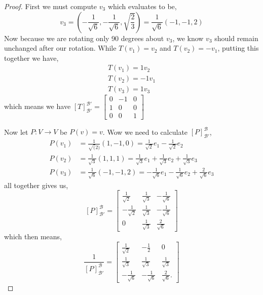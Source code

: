 \documentclass[11pt]{article}
\begin{document}
\begin{proof}
  First we must compute $v_3$ which evaluates to be,
  \[v_3 = (-\frac{1}{\sqrt{6}}, -\frac{1}{\sqrt{6}}, \sqrt{\frac{2}{3}}) = \frac{1}{\sqrt{6}}(-1,-1,2)\]
  Now because we are rotating only 90 degrees about $v_3$, we know $v_3$ should remain unchanged after our rotation. While $T(v_1) = v_2$ and $T(v_2) = -v_1$, putting this together we have,
  \begin{align*}
    T(v_1) = 1v_2 \\
    T(v_2) = -1v_1 \\
    T(v_3) = 1v_3
  \end{align*}
  which means we have $[T]_{\mathcal{B}'}^{\mathcal{B}'} = \begin{bmatrix}
    0 & -1 & 0 \\
    1 & 0 & 0 \\
    0 & 0 & 1
  \end{bmatrix}$

  Now let $P:V \to V$ be $P(v) = v$. Wow we need to calculate $[P]_{\mathcal{B}'}^{\mathcal{B}}$, 
  \begin{align*}
    P(v_1) &= \frac{1}{\sqrt(2)}(1,-1,0) = \frac{1}{\sqrt{2}}e_1 -\frac{1}{\sqrt{2}}e_2  \\
    P(v_2) &= \frac{1}{\sqrt{3}}(1,1,1) = \frac{1}{\sqrt{3}}e_1 + \frac{1}{\sqrt{3}}e_2 + \frac{1}{\sqrt{3}}e_3 \\
    P(v_3) &= \frac{1}{\sqrt{6}}(-1,-1,2) = -\frac{1}{\sqrt{6}}e_1 -\frac{1}{\sqrt{6}}e_2 + \frac{2}{\sqrt{6}}e_3 
  \end{align*}
  all together gives us,
  \[[P]_{\mathcal{B}'}^{\mathcal{B}} = \begin{bmatrix}
    \frac{1}{\sqrt{2}} & \frac{1}{\sqrt{3}} & -\frac{1}{\sqrt{6}} \\
    - \frac{1}{\sqrt{2}} & \frac{1}{\sqrt{3}} & -\frac{1}{\sqrt{6}} \\
    0 & \frac{1}{\sqrt{3}} & \frac{2}{\sqrt{6}}
  \end{bmatrix}\]
  which then means,
  \[\frac{1}{[P]_{\mathcal{B}'}^{\mathcal{B}}}= \begin{bmatrix}
    \frac{1}{\sqrt{2}} & -\frac{1}{2} & 0 \\
    \frac{1}{\sqrt{3}} & \frac{1}{\sqrt{3}} & \frac{1}{\sqrt{3}} \\
    -\frac{1}{\sqrt{6}} & -\frac{1}{\sqrt{6}} & \frac{2}{\sqrt{6}}.
  \end{bmatrix}\]


\end{proof}
\end{document}
